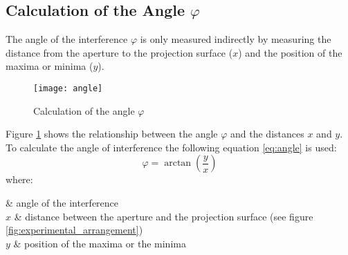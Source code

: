 \subsection{Calculation of the Angle $\varphi$}
\label{subsec:Calculation_of_the_Angle}
The angle of the interference $\varphi$ is only measured indirectly by measuring the distance from the aperture to the projection surface ($x$) and the position of the maxima or minima ($y$).
\begin{figure}[H]
	\centering
	\texttt{[image: angle]}
	\caption{Calculation of the angle $\varphi$}
	\label{fig:angle}
\end{figure}
Figure \ref{fig:angle} shows the relationship between the angle $\varphi$ and the distances $x$ and $y$. To calculate the angle of interference the following equation \ref{eq:angle} is used:
\begin{equation}
\varphi = \arctan\left(\frac{y}{x}\right)
\label{eq:angle}
\end{equation}
where:
\begin{conditions}
	\varphi & angle of the interference \\
	$x$ & distance between the aperture and the projection surface (see figure \ref{fig:experimental_arrangement}) \\
	$y$ & position of the maxima or the minima
\end{conditions}
